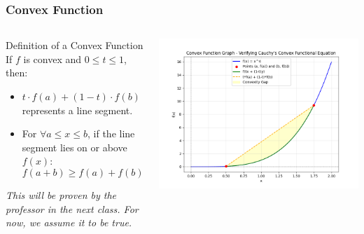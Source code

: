 \begin{frame}
    \frametitle{Convex Function}
    \vspace{0.3cm}

    \begin{columns}
        \begin{block}{Definition of a Convex Function}
            If $f$ is convex and $0 \leq t \leq 1$, then:
            \begin{itemize}
                \item $t \cdot f(a) + (1-t) \cdot f(b)$ represents a line segment.
                \item For \( \forall a \leq x \leq b \), if the line segment lies on or above $f(x)$:
                \[
                f(a+b) \geq f(a) + f(b) \tag{Eq. 1}
                \]
            \end{itemize}
            \textit{This will be proven by the professor in the next class. For now, we assume it to be true.}
        \end{block}

        \centering
        \includegraphics[width=\linewidth]{figures/general/convex.png}
        
    \end{columns}
\end{frame}
